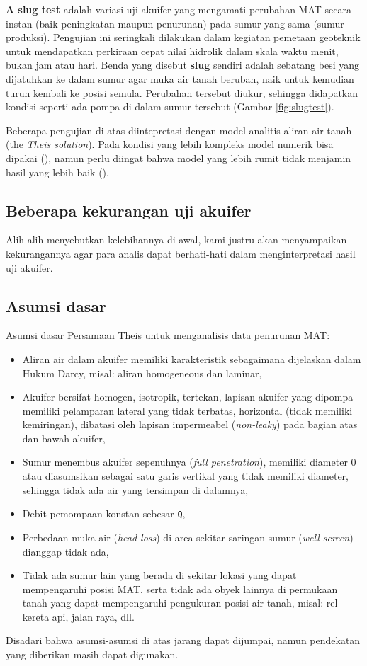 \textbf{A slug test} adalah variasi uji akuifer yang mengamati perubahan MAT secara instan (baik peningkatan maupun penurunan) pada sumur yang sama (sumur produksi). Pengujian ini seringkali dilakukan dalam kegiatan pemetaan geoteknik untuk mendapatkan perkiraan cepat nilai hidrolik dalam skala waktu menit, bukan jam atau hari. Benda yang disebut \textbf{slug} sendiri adalah sebatang besi yang dijatuhkan ke dalam sumur agar muka air tanah berubah, naik untuk kemudian turun kembali ke posisi semula. Perubahan tersebut diukur, sehingga didapatkan kondisi seperti ada pompa di dalam sumur tersebut (Gambar \ref{fig:slugtest}).

Beberapa pengujian di atas diintepretasi dengan model analitis  aliran air tanah (the \textit{Theis solution}). Pada kondisi yang lebih kompleks model numerik bisa dipakai (\cite{lebbe1995validation}), namun perlu diingat bahwa model yang lebih rumit tidak menjamin hasil yang lebih baik (\cite{Johnson_2001}\cite{Rushton_1976}\cite{Rathod_1984}\cite{2011}\cite{Lebbe_1999}\cite{Lebbe_1999}). 

\subsection{Beberapa kekurangan uji akuifer}

Alih-alih menyebutkan kelebihannya di awal, kami justru akan menyampaikan kekurangannya agar para analis dapat berhati-hati dalam menginterpretasi hasil uji akuifer.


\subsection{Asumsi dasar}

Asumsi dasar Persamaan Theis untuk menganalisis data penurunan MAT:

\begin{itemize}
\item Aliran air dalam akuifer memiliki karakteristik sebagaimana dijelaskan dalam Hukum Darcy, misal: aliran homogeneous dan laminar, 
\item Akuifer bersifat homogen, isotropik, tertekan, lapisan akuifer yang dipompa memiliki pelamparan lateral yang tidak terbatas, horizontal (tidak memiliki kemiringan), dibatasi oleh lapisan impermeabel (\textit{non-leaky}) pada bagian atas dan bawah akuifer,
\item Sumur menembus akuifer sepenuhnya (\textit{full penetration}), memiliki diameter 0 atau diasumsikan sebagai satu garis vertikal yang tidak memiliki diameter, sehingga tidak ada air yang tersimpan di dalamnya,
\item Debit pemompaan konstan sebesar \verb|Q|,
\item Perbedaan muka air (\textit{head loss}) di area sekitar saringan sumur (\textit{well screen}) dianggap tidak ada,
\item Tidak ada sumur lain yang berada di sekitar lokasi yang dapat mempengaruhi posisi MAT, serta tidak ada obyek lainnya di permukaan tanah yang dapat mempengaruhi pengukuran posisi air tanah, misal: rel kereta api, jalan raya, dll.
\end{itemize}

Disadari bahwa asumsi-asumsi di atas jarang dapat dijumpai, namun pendekatan yang diberikan masih dapat digunakan. 

